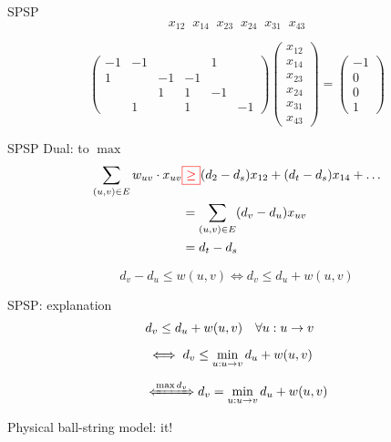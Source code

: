 \begin{frame}{SPSP}
  \[
	x_{12}\;\; x_{14}\;\;	x_{23}\;\;	x_{24}\;\;	x_{31}\;\;	x_{43}
  \]

  \begin{equation*}
	\begin{pmatrix}
	  -1	&	-1	&	&	&	1	&	\\
	  1		&		&	-1	&	-1	&	\\
	  		&		&	1	&	1	&	-1	\\
	 		&	1	&	&	1	&	&	-1
	\end{pmatrix}
	\begin{pmatrix}
	  x_{12}\\x_{14}\\x_{23}\\x_{24}\\x_{31}\\x_{43}
	\end{pmatrix}
	= 
	\begin{pmatrix}
	  -1\\0\\0\\1
	\end{pmatrix}
  \end{equation*}
\end{frame}
\begin{frame}{SPSP}
  Dual: to $\max$
  \begin{align*}
	\sum_{(u,v) \in E} w_{uv} \cdot x_{uv} & \textcolor{red}{\boxed{\geq}} (d_2 - d_s) x_{12} + (d_t - d_s) x_{14} + \dots	\\
	&	=	\sum_{(u,v) \in E} (d_v - d_u) x_{uv}	\\
	&	=	d_t - d_s
  \end{align*}

  \[
	d_v - d_u \leq w(u,v) \iff d_v \leq d_u + w(u,v)
  \]
\end{frame}
\begin{frame}{SPSP: explanation}
  \begin{align*}
	&	d_v \leq d_u + w(u,v)	\quad \forall u: u \to v	\\[6pt]
	& 	\iff	d_v \leq \min_{u: u \to v} d_u + w(u,v)	\\[6pt]
	&	\xLeftrightarrow{\max d_v}	d_v = \min_{u: u \to v} d_u + w(u,v)
  \end{align*}

  \vspace{0.50cm}

  \begin{center}
	Physical ball-string model:  it!
  \end{center}
\end{frame}
